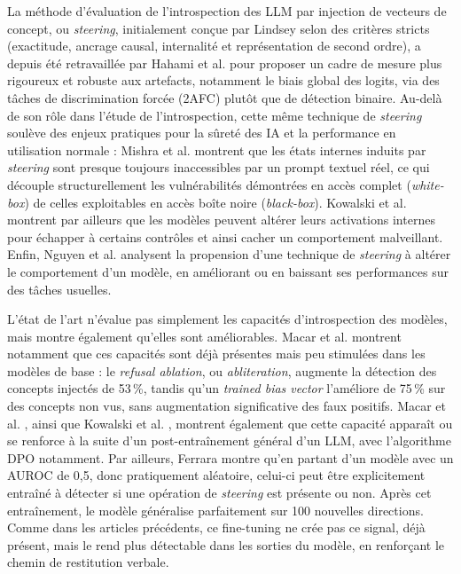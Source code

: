 \documentclass[10pt,a4paper]{article}
\begin{document}
La méthode d'évaluation de l'introspection des LLM par injection de vecteurs de concept, ou \emph{steering}, initialement conçue par Lindsey \cite{lindsey2026} selon des critères stricts (exactitude, ancrage causal, internalité et représentation de second ordre), a depuis été retravaillée par Hahami et al. \cite{hahami2026} pour proposer un cadre de mesure plus rigoureux et robuste aux artefacts, notamment le biais global des logits, via des tâches de discrimination forcée (2AFC) plutôt que de détection binaire. Au-delà de son rôle dans l'étude de l'introspection, cette même technique de \emph{steering} soulève des enjeux pratiques pour la sûreté des IA et la performance en utilisation normale : Mishra et al. \cite{mishra2026} montrent que les états internes induits par \emph{steering} sont presque toujours inaccessibles par un prompt textuel réel, ce qui découple structurellement les vulnérabilités démontrées en accès complet (\emph{white-box}) de celles exploitables en accès boîte noire (\emph{black-box}). Kowalski et al. \cite{kowalski2026} montrent par ailleurs que les modèles peuvent altérer leurs activations internes pour échapper à certains contrôles et ainsi cacher un comportement malveillant. Enfin, Nguyen et al. \cite{nguyen2026} analysent la propension d'une technique de \emph{steering} à altérer le comportement d'un modèle, en améliorant ou en baissant ses performances sur des tâches usuelles.

L'état de l'art n'évalue pas simplement les capacités d'introspection des modèles, mais montre également qu'elles sont améliorables. Macar et al. \cite{macar2026} montrent notamment que ces capacités sont déjà présentes mais peu stimulées dans les modèles de base : le \emph{refusal ablation}, ou \emph{abliteration}, augmente la détection des concepts injectés de 53\,\%, tandis qu'un \emph{trained bias vector} l'améliore de 75\,\% sur des concepts non vus, sans augmentation significative des faux positifs. Macar et al. \cite{macar2026}, ainsi que Kowalski et al. \cite{kowalski2026}, montrent également que cette capacité apparaît ou se renforce à la suite d'un post-entraînement général d'un LLM, avec l'algorithme DPO notamment. Par ailleurs, Ferrara \cite{ferrara2026} montre qu'en partant d'un modèle avec un AUROC de 0,5, donc pratiquement aléatoire, celui-ci peut être explicitement entraîné à détecter si une opération de \emph{steering} est présente ou non. Après cet entraînement, le modèle généralise parfaitement sur 100 nouvelles directions. Comme dans les articles précédents, ce fine-tuning ne crée pas ce signal, déjà présent, mais le rend plus détectable dans les sorties du modèle, en renforçant le chemin de restitution verbale.
\end{document}
